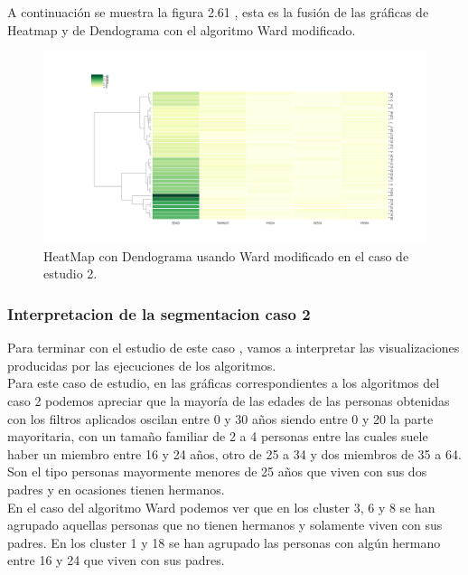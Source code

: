 	A continuación se muestra la figura 2.61 , esta es la fusión de las gráficas de 
	Heatmap y de Dendograma con el algoritmo Ward modificado.  \\

	\begin{figure}[htb]
		\centering
		\includegraphics[width=1.0\textwidth]{./imagenes/caso2/heatmapcondendograma_caso2_Ward_modificado}
		\caption{HeatMap con Dendograma usando Ward modificado en el caso de estudio 2.} \label{fig:1}
	\end{figure}


	\subsubsection[Interpretacion de la segmentacion caso 2]{Interpretacion de la segmentacion caso 2}

	Para terminar con el estudio de este caso , vamos a interpretar las visualizaciones producidas
	por las ejecuciones de los algoritmos. \\

	Para este caso de estudio, en las gráficas correspondientes a los algoritmos del caso 2
	podemos apreciar que la mayoría de las
	edades de las personas obtenidas con los filtros aplicados  
	oscilan entre 0 y 30 años siendo entre 0 y 20 la parte mayoritaria, con un tamaño familiar de 2 a 4 personas entre las cuales suele haber 
	un miembro entre 16 y 24 años, otro de 25 a 34 y dos miembros de 35 a 64. Son el tipo personas mayormente menores de 25 años que 
	viven con sus dos padres y en ocasiones tienen hermanos.\\

	En el caso del algoritmo Ward podemos ver que en los cluster 3, 6 y 8 se han agrupado aquellas personas
	que no tienen hermanos y solamente viven con sus padres. En los cluster 1 y 18 se han agrupado 
	las personas con algún hermano entre 16 y 24 que viven con sus padres. \\

